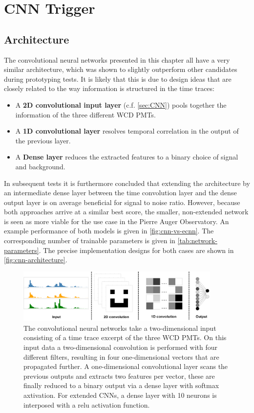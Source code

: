 \section{CNN Trigger}
\label{sec:cnn-performance}

\subsection{Architecture}
\label{ssec:cnn-architecture}

The convolutional neural networks presented in this chapter all have a very similar architecture, which was shown to slightly outperform other candidates during 
prototyping tests. It is likely that this is due to design ideas that are closely related to the way information is structured in the time traces:

\begin{itemize}
	\item A \textbf{2D convolutional input layer} (c.f. \autoref{sec:CNN}) pools together the information of the three different WCD PMTs.
	\item A \textbf{1D convolutional layer} resolves temporal correlation in the output of the previous layer.
	\item A \textbf{Dense layer} reduces the extracted features to a binary choice of signal and background.
\end{itemize}

In subsequent tests it is furthermore concluded that extending the architecture by an intermediate dense layer between the time convolution layer and the dense 
output layer is on average beneficial for signal to noise ratio. However, because both approaches arrive at a similar best score, the smaller, non-extended network
is seen as more viable for the use case in the Pierre Auger Observatory. An example performance of both models is given in \autoref{fig:cnn-vs-ecnn}. The 
corresponding number of trainable parameters is given in \autoref{tab:network-parameters}. The precise implementation designs for both cases are shown in 
\autoref{fig:cnn-architecture}.

\begin{figure}
	\centering
	\includegraphics[width=0.9\textwidth]{./imgs/CNN_architecture.png}
	\caption{The convolutional neural networks take a two-dimensional input consisting of a time trace excerpt of the three WCD PMTs. On this input data a 
	two-dimensional convolution is performed with four different filters, resulting in four one-dimensional vectors that are propagated further. A one-dimensional
	convolutional layer scans the previous outputs and extracts two features per vector, these are finally reduced to a binary output via a dense layer with 
	softmax axtivation. For extended CNNs, a dense layer with 10 neurons is interposed with a relu activation function.}
	\label{fig:cnn-architecture}
\end{figure}


